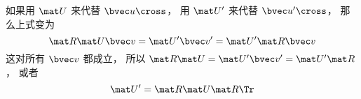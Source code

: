 如果用 $\mat U$ 来代替 $\bvec u\cross$， 用 $\mat U'$ 来代替 $\bvec u'\cross$， 那么上式变为
\begin{equation}
\mat R \mat U \bvec v = \mat U' \bvec v' = \mat U'\mat R\bvec v
\end{equation}
这对所有 $\bvec v$ 都成立， 所以 $\mat R \mat U = \mat U' \bvec v' = \mat U'\mat R$， 或者
\begin{equation}
\mat U' = \mat R \mat U \mat R\Tr
\end{equation}

